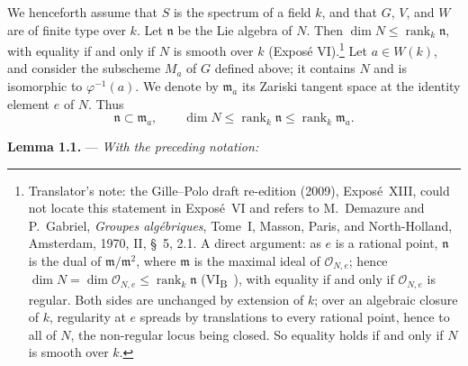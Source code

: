
We henceforth assume that \(S\) is the spectrum of a field \(k\), and
that \(G\), \(V\), and \(W\) are of finite type over \(k\). Let
\(\mathfrak n\) be the Lie algebra of \(N\). Then
\(\dim N\leq\operatorname{rank}_k\mathfrak n\), with equality if and
only if \(N\) is smooth over \(k\) (Exposé VI).\footnote{Translator's
note: the Gille--Polo draft re-edition (2009), Exposé~XIII, could not
locate this statement in Exposé~VI and refers to M.~Demazure and
P.~Gabriel, \emph{Groupes algébriques}, Tome~I, Masson, Paris, and
North-Holland, Amsterdam, 1970, II, \S~5, 2.1. A direct argument: as \(e\)
is a rational point, \(\mathfrak n\) is the dual of
\(\mathfrak m/\mathfrak m^2\), where \(\mathfrak m\) is the maximal ideal
of \(\mathcal O_{N,e}\); hence
\(\dim N=\dim\mathcal O_{N,e}\leq\operatorname{rank}_k\mathfrak n\)
(VI\textsubscript{B}~), with equality if
and only if \(\mathcal O_{N,e}\) is regular. Both sides are unchanged by
extension of \(k\); over an algebraic closure of \(k\), regularity at \(e\)
spreads by translations to every rational point, hence to all of \(N\),
the non-regular locus being closed. So equality holds if and only if \(N\)
is smooth over \(k\).} Let \(a\in W(k)\), and
consider the subscheme \(M_a\) of \(G\) defined above; it contains
\(N\) and is isomorphic to \(\varphi^{-1}(a)\). We denote by
\(\mathfrak m_a\) its Zariski tangent space at the identity element
\(e\) of \(N\). Thus
\[
\tag{1}
  \mathfrak n\subset\mathfrak m_a,\qquad
  \dim N\leq\operatorname{rank}_k\mathfrak n
  \leq\operatorname{rank}_k\mathfrak m_a.
\]

\medskip
\noindent{}\textbf{Lemma 1.1.} ---
\textit{With the preceding notation:}

